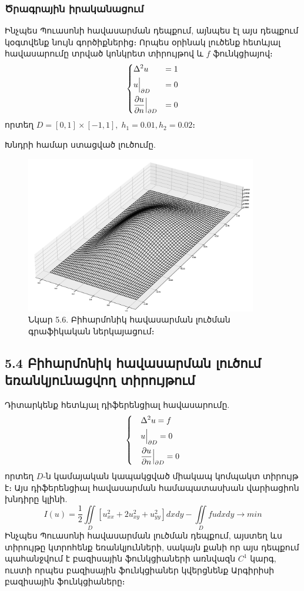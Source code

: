\documentclass[fleqn, bachelor,subf,12pt,notitlepage]{article}
\begin{document}
\subsubsection*{{Ծրագրային իրականացում}}
Ինչպես Պուասոնի հավասարման դեպքում, այնպես էլ այս դեպքում կօգտվենք նույն գործիքներից։
Որպես օրինակ լուծենք հետևյալ հավասարումը տրված կոնկրետ տիրույթով և $f$ ֆունկցիայով։
$$\begin{dcases}
								\Delta^{2} u &=1 \\
								u \Big |_{\partial D} &= 0\\
								\dfrac{\partial u}{\partial n} \Big |_{\partial D} &= 0
\end{dcases}$$
որտեղ $D = \left[0, 1\right] \times \left[-1, 1\right], \; h_{1}=0.01, h_{2}=0.02$։

Խնդրի համար ստացված լուծումը.
\begin{figure}[H]
\centering
\includegraphics[width=0.9\textwidth]{images/biharmonic_equation_solution}
\captionsetup{labelformat=empty}
\caption{Նկար 5.6. Բիհարմոնիկ հավասարման լուծման գրաֆիկական ներկայացում։}
\end{figure}

\newpage
\subsection*{{5.4 Բիհարմոնիկ հավասարման լուծում եռանկյունացվող տիրույթում}}
Դիտարկենք հետևյալ դիֆերենցիալ հավասարումը.
\begin{equation}
\begin{dcases}
&\Delta^{2} u =f \\
&u \Big |_{\partial D} = 0\\
&\dfrac{\partial u}{\partial n} \Big |_{\partial D} = 0
\end{dcases}
\end{equation}
որտեղ $D$-ն կամայական կապակցված միակապ կոմպակտ տիրույթ է։
Այս դիֆերենցիալ հավասարման  համապատասխան վարիացիոն խնդիրը կլինի.
\begin{equation}
I(u) = \frac{1}{2}\iint \limits_{D} \left[u_{xx}^{2} + 2u_{xy}^{2} + u_{yy}^{2} \right]dxdy - \iint \limits_{D} fudxdy \longrightarrow min
\end{equation}
Ինչպես Պուասոնի հավասարման լուծման դեպքում, այստեղ ևս տիրույթը կտրոհենք եռանկյունների, սակայն քանի որ այս դեպքում պահանջվում է բազիսային ֆունկցիաների առնվազն $C^{1}$ կարգ, ուստի որպես բազիսային ֆունկցիաներ կվերցնենք Արգիրիսի բազիսային ֆունկցիաները։
\end{document}
